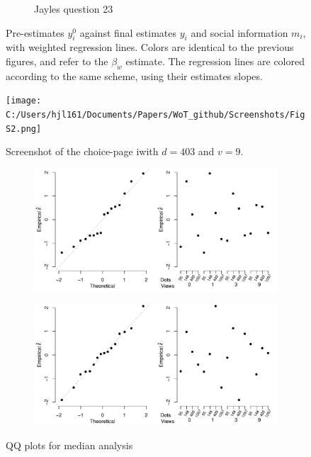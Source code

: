 \documentclass[9pt,twoside,lineno]{pnas-new}
\begin{document}
\begin{figure}[htbp]
\begin{subfigure}[b]{.24\textwidth}
		\caption{Jayles question 23}
	\end{subfigure}
	\caption{Pre-estimates $y_i^0$ against final estimates $y_i$ and social information $m_i$, with weighted regression lines. Colors are identical to the previous figures, and refer to the $\beta_w$ estimate. The regression lines are colored according to the same scheme, using their estimates slopes.}\label{fig: Jayles 3d}
\end{figure}


\begin{figure}
\centering
\texttt{[image: C:/Users/hjl161/Documents/Papers/WoT\_github/Screenshots/FigS2.png]}
\caption{Screenshot of the choice-page iwith $d=403$ and $v=9$.}
\end{figure}


\begin{figure}
	\begin{subfigure}[b]{.8\textwidth}
		\includegraphics[width=\textwidth]{../plots/med_residual_h.pdf}
	\end{subfigure}
	\begin{subfigure}[b]{.8\textwidth}
		\includegraphics[width=\textwidth]{../plots/med_residual_m.pdf}	
	\end{subfigure}
	\caption{QQ plots for median analysis}
	\label{fig: qq plots median}
\end{figure}
\end{document}
